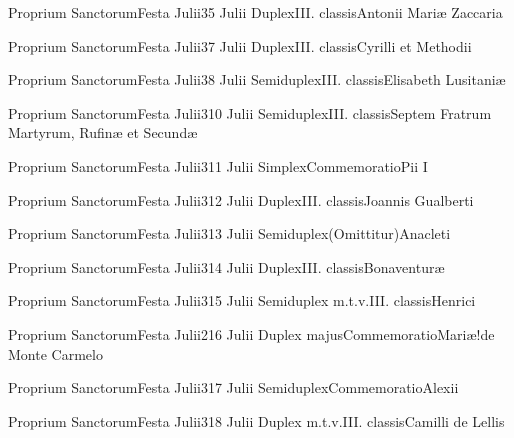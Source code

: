 \documentclass[psalterium-feriale.tex]{subfiles}
\begin{document}
	{Proprium Sanctorum}{Festa Julii}{3}{5 Julii}
	{Duplex}{III. classis}{Antonii Mariæ Zaccaria}
	{}
	{}

	{Proprium Sanctorum}{Festa Julii}{3}{7 Julii}
	{Duplex}{III. classis}{Cyrilli et Methodii}
	{}
	{}

	{Proprium Sanctorum}{Festa Julii}{3}{8 Julii}
	{Semiduplex}{III. classis}{Elisabeth Lusitaniæ}
	{}
	{}

	{Proprium Sanctorum}{Festa Julii}{3}{10 Julii}
	{Semiduplex}{III. classis}{Septem Fratrum Martyrum, Rufinæ et Secundæ}
	{}
	{}

	{Proprium Sanctorum}{Festa Julii}{3}{11 Julii}
	{Simplex}{Commemoratio}{Pii I}
	{}
	{}

	{Proprium Sanctorum}{Festa Julii}{3}{12 Julii}
	{Duplex}{III. classis}{Joannis Gualberti}
	{}
	{}

	{Proprium Sanctorum}{Festa Julii}{3}{13 Julii}
	{Semiduplex}{(Omittitur)}{Anacleti}
	{}
	{}

	{Proprium Sanctorum}{Festa Julii}{3}{14 Julii}
	{Duplex}{III. classis}{Bonaventuræ}
	{}
	{}

	{Proprium Sanctorum}{Festa Julii}{3}{15 Julii}
	{Semiduplex m.t.v.}{III. classis}{Henrici}
	{}
	{}

	{Proprium Sanctorum}{Festa Julii}{2}{16 Julii}
	{Duplex majus}{Commemoratio}{Mariæ!de Monte Carmelo}
	{}
	{}
\psalmodiapropria

	{Proprium Sanctorum}{Festa Julii}{3}{17 Julii}
	{Semiduplex}{Commemoratio}{Alexii}
	{}
	{}

	{Proprium Sanctorum}{Festa Julii}{3}{18 Julii}
	{Duplex m.t.v.}{III. classis}{Camilli de Lellis}
	{}
	{}
\end{document}
